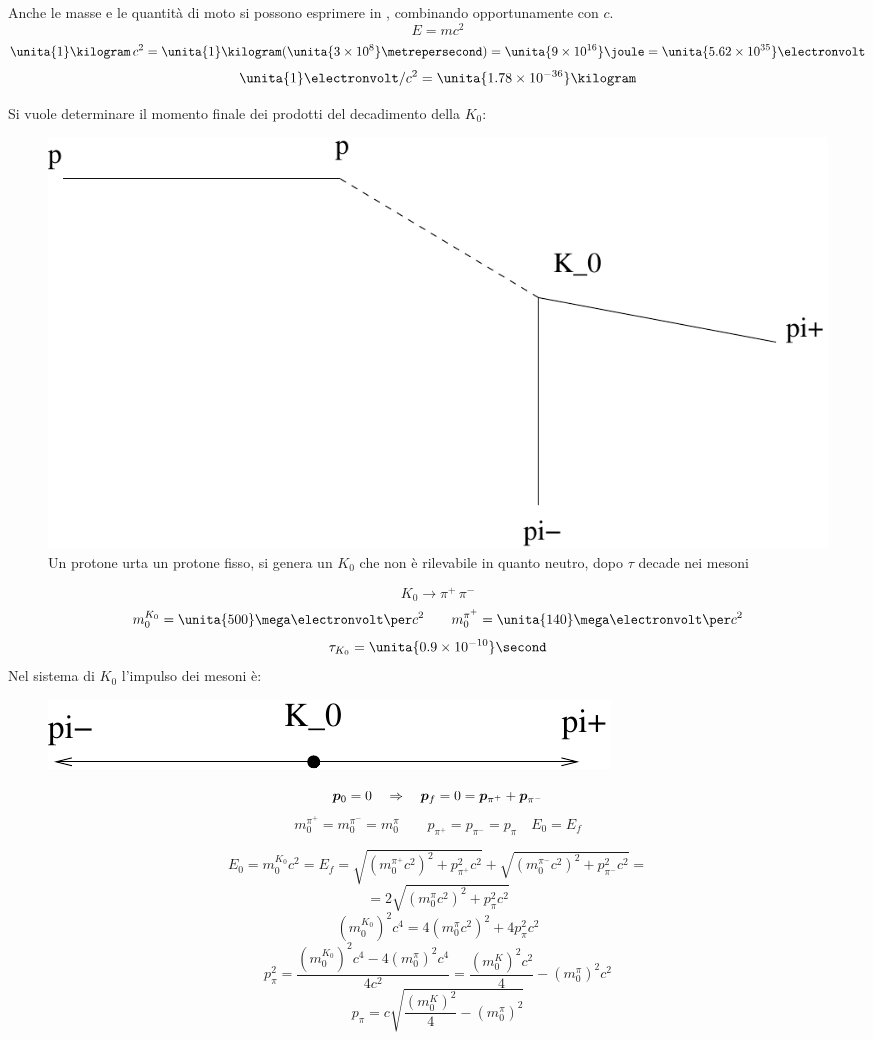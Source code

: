 Anche le masse e le quantità di moto si possono esprimere in \electronvolt, combinando opportunamente con $c$.
$$E=mc^2$$
$$\unita{1}\kilogram\,c^2=\unita{1}\kilogram(\unita{3\times 10^8}\metrepersecond)=\unita{9\times 10^{16}}\joule=\unita{5.62\times 10^{35}}\electronvolt$$
$$\unita{1}\electronvolt/c^2=\unita{1.78\times 10^{-36}}\kilogram$$
\begin{Es}
Si vuole determinare il momento finale dei prodotti del decadimento della $K_0$:
\begin{figure}[htbp]
   \centering
   \includegraphics[scale=0.5]{immagini/fisica1/dec_strano}
   \caption{Un protone urta un protone fisso, si genera un $K_0$ che non è rilevabile in quanto neutro, dopo $\tau$ decade nei mesoni}
   \label{}
\end{figure}
$$K_0\rightarrow \pi^+\,\pi^-$$
$$m_0^{K_0}=\unita{500}\mega\electronvolt\per c^2\qquad m_0^{\pi^+}=\unita{140}\mega\electronvolt\per c^2$$
$$\tau_{K_0}=\unita{0.9\times 10^{-10}}\second$$
Nel sistema di $K_0$ l'impulso dei mesoni è:
\begin{figure}[htbp]
   \centering
   \includegraphics[scale=0.5]{immagini/fisica1/dec_strano2}
\end{figure}
\begin{equation*}
\boldsymbol{p}_0=0\quad \Rightarrow \quad \boldsymbol{p}_f=0 = \boldsymbol{p}_{\pi^+}+\boldsymbol{p}_{\pi^-}
\end{equation*}
\begin{equation*}
m_0^{\pi^+}=m_0^{\pi^-}=m_0^{\pi}\qquad p_{\pi^+}=p_{\pi^-}=p_{\pi}\quad E_0=E_f
\end{equation*}

$$E_0=m_0^{K_0}c^2=E_f=\sqrt{(m_0^{\pi^+}c^2)^2+p_{\pi^+}^2c^2}+\sqrt{(m_0^{\pi^-}c^2)^2+p_{\pi^-}^2c^2}=$$
$$=2\sqrt{(m_0^\pi c^2)^2+p_{\pi}^2c^2}$$
$$(m_0^{K_0})^2c^4=4(m_0^\pi c^2)^2+4p_{\pi}^2c^2$$
$$p_\pi^2=\frac{(m_0^{K_0})^2c^4-4(m_0^{\pi})^2c^4}{4c^2}=\frac{(m_0^K)^2c^2}{4}-(m_0^\pi)^2c^2$$
$$p_\pi=c\sqrt{\frac{(m_0^K)^2}{4}-(m_0^\pi)^2}$$
\end{Es}
